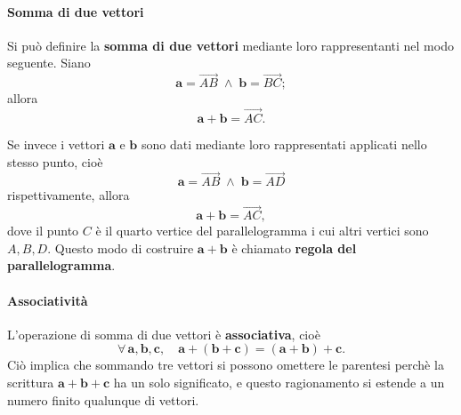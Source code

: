 \documentclass{article}
\theoremstyle{plain}
\theoremstyle{definition}
\theoremstyle{remark}
\begin{document}
\paragraph{Somma di due vettori}
Si può definire la \textbf{somma di due vettori} mediante loro rappresentanti nel modo seguente.
Siano \[\mathbf{a}=\overrightarrow{AB}\;\land\;\mathbf{b}=\overrightarrow{BC};\] allora \[\mathbf{a}+\mathbf{b}=\overrightarrow{AC}.\]
\begin{center}
    \begin{figure}[H]
        \centering
    \end{figure}
\end{center}
Se invece i vettori $\mathbf{a}$ e $\mathbf{b}$ sono dati mediante loro rappresentati applicati nello stesso punto, cioè \[\mathbf{a}=\overrightarrow{AB} \;\land\; \mathbf{b}=\overrightarrow{AD}\] rispettivamente, allora \[\mathbf{a}+\mathbf{b}=\overrightarrow{AC},\] dove il punto $C$ è il quarto vertice del parallelogramma i cui altri vertici sono $A,B,D$.
Questo modo di costruire $\mathbf{a}+\mathbf{b}$ è chiamato \textbf{regola del parallelogramma}.
\begin{center}
    \begin{figure}[H]
        \centering
    \end{figure}
\end{center}

\vspace{10pt}

\paragraph{Associatività}
L'operazione di somma di due vettori è \textbf{associativa}, cioè 
\[\forall\,\mathbf{a},\mathbf{b},\mathbf{c},\quad\mathbf{a}+(\mathbf{b}+\mathbf{c})=(\mathbf{a}+\mathbf{b})+\mathbf{c}.\]
Ciò implica che sommando tre vettori si possono omettere le parentesi perchè la scrittura $\mathbf{a}+\mathbf{b}+\mathbf{c}$ ha un solo significato, e questo ragionamento si estende a un numero finito qualunque di vettori.
\end{document}
